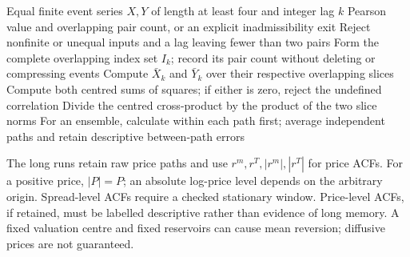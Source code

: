\documentclass[11pt,a4paper]{article}
\begin{document}
\begin{algorithm}[H]
\caption{Overlapping-slice Pearson dependence at an executed-trade lag}\label{alg:correlation}
\begin{algorithmic}[1]
\Require Equal finite event series $X,Y$ of length at least four and integer lag $k$
\Ensure Pearson value and overlapping pair count, or an explicit inadmissibility exit
\State Reject nonfinite or unequal inputs and a lag leaving fewer than two pairs
\State Form the complete overlapping index set $I_k$; record its pair count without deleting or compressing events
\State Compute $\bar X_k$ and $\bar Y_k$ over their respective overlapping slices
\State Compute both centred sums of squares; if either is zero, reject the undefined correlation
\State Divide the centred cross-product by the product of the two slice norms
\State For an ensemble, calculate within each path first; average independent paths and retain descriptive between-path errors
\end{algorithmic}
\end{algorithm}

The long runs retain raw price paths and use $r^m,r^T,|r^m|,|r^T|$ for
price ACFs. For a positive price, $|P|=P$; an absolute log-price level depends
on the arbitrary origin. Spread-level ACFs require a checked stationary
window. Price-level ACFs, if retained, must be labelled descriptive rather
than evidence of long memory. A fixed valuation centre and fixed reservoirs
can cause mean reversion; diffusive prices are not guaranteed.

\clearpage
\end{document}
